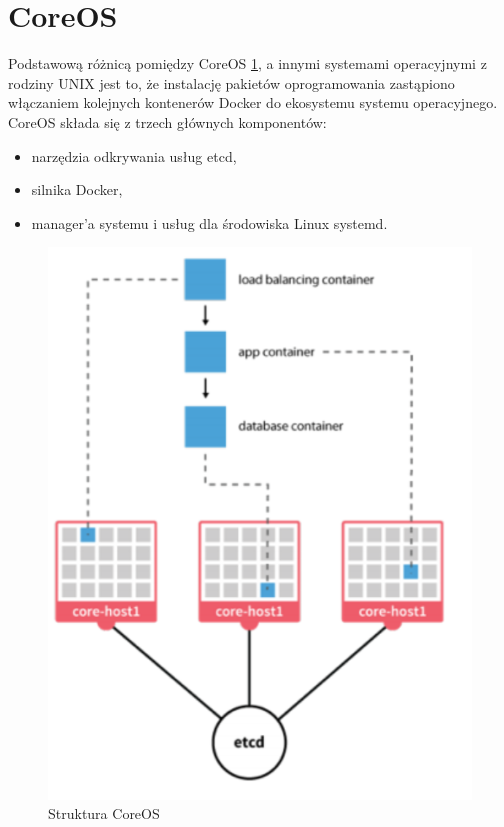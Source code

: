 \section{CoreOS}

Podstawową różnicą pomiędzy CoreOS \ref{coreOS}, a innymi systemami operacyjnymi z rodziny UNIX jest to, że instalację pakietów oprogramowania zastąpiono włączaniem kolejnych kontenerów Docker do ekosystemu systemu operacyjnego. CoreOS składa się z trzech głównych komponentów:

\begin{itemize}
\item narzędzia odkrywania usług etcd,
\item silnika Docker,
\item manager'a systemu i usług dla środowiska
Linux systemd.
\end{itemize}

\begin{figure}[h] \centering %
	\includegraphics{img/coreOS.png}
	\caption{Struktura CoreOS\cite{coreOS}}
	\label{coreOS}
\end{figure}

